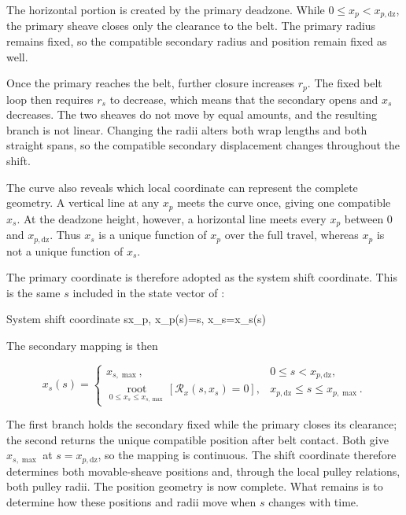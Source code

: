 \documentclass[11pt]{report}
\numberwithin{equation}{section}
\begin{document}
The horizontal portion is created by the primary deadzone. While
$0\leq x_p<x_{p,\mathrm{dz}}$, the primary sheave closes only the clearance to
the belt. The primary radius remains fixed, so the compatible secondary radius
and position remain fixed as well.

Once the primary reaches the belt, further closure increases $r_p$. The fixed
belt loop then requires $r_s$ to decrease, which means that the secondary
opens and $x_s$ decreases. The two sheaves do not move by equal amounts, and
the resulting branch is not linear. Changing the radii alters both wrap
lengths and both straight spans, so the compatible secondary displacement
changes throughout the shift.

The curve also reveals which local coordinate can represent the complete
geometry. A vertical line at any $x_p$ meets the curve once, giving one
compatible $x_s$. At the deadzone height, however, a horizontal line meets
every $x_p$ between $0$ and $x_{p,\mathrm{dz}}$. Thus $x_s$ is a unique
function of $x_p$ over the full travel, whereas $x_p$ is not a unique function
of $x_s$.

The primary coordinate is therefore adopted as the system shift coordinate.
This is the same $s$ included in the state vector of
:

{System shift coordinate}
{
    s\equiv x_p,
    \qquad
    x_p(s)=s,
    \qquad
    x_s=x_s(s)
}

The secondary mapping is then

\begin{equation}
    x_s(s)
    =
    \begin{cases}
        x_{s,\max},
        & 0\leq s<x_{p,\mathrm{dz}},\\[4pt]
        \displaystyle
        \operatorname*{root}_{0\leq x_s\leq x_{s,\max}}
        \!\left[\mathcal{R}_x(s,x_s)=0\right],
        & x_{p,\mathrm{dz}}\leq s\leq x_{p,\max}.
    \end{cases}
    \label{eq:secondary_coordinate_map}
\end{equation}

The first branch holds the secondary fixed while the primary closes its
clearance; the second returns the unique compatible position after belt
contact. Both give $x_{s,\max}$ at $s=x_{p,\mathrm{dz}}$, so the mapping is
continuous. The shift coordinate therefore determines both movable-sheave 
positions and, through the local pulley relations, both pulley radii. The 
position geometry is now complete. What remains is to determine how these 
positions and radii move when $s$ changes with time.
\end{document}
